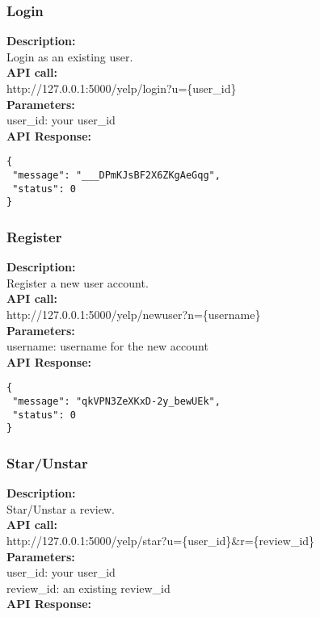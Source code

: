 \documentclass[12pt]{article}
\begin{document}
\subsubsection{Login}
\textbf{Description:}\\
Login as an existing user.\\
\textbf{API call:}\\ 
http://127.0.0.1:5000/yelp/login?u=\{user\_id\}\\
\textbf{Parameters:}\\
user\_id: your user\_id\\
\textbf{API Response:}

\begin{singlespacing}
\begin{lstlisting}
{
 "message": "___DPmKJsBF2X6ZKgAeGqg",
 "status": 0
}
\end{lstlisting}
\end{singlespacing}

\subsubsection{Register}
\textbf{Description:}\\
Register a new user account.\\
\textbf{API call:}\\
http://127.0.0.1:5000/yelp/newuser?n=\{username\}\\
\textbf{Parameters:}\\
username: username for the new account\\
\textbf{API Response:}

\begin{singlespacing}
\begin{lstlisting}
{
 "message": "qkVPN3ZeXKxD-2y_bewUEk",
 "status": 0
}
\end{lstlisting}
\end{singlespacing}

\subsubsection{Star/Unstar}
\textbf{Description:}\\
Star/Unstar a review.\\
\textbf{API call:}\\
http://127.0.0.1:5000/yelp/star?u=\{user\_id\}\&r=\{review\_id\}\\
\textbf{Parameters:}\\
user\_id: your user\_id\\
review\_id: an existing review\_id\\
\textbf{API Response:}
\end{document}
